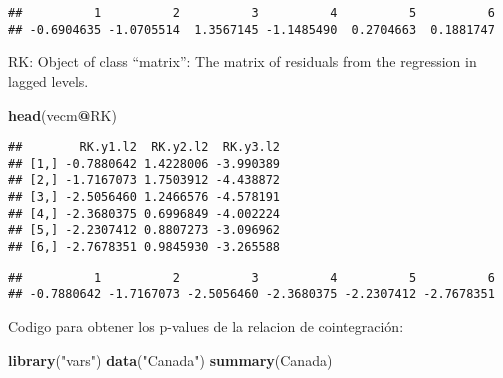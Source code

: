 \documentclass[]{book}
\newenvironment{Shaded}{\begin{snugshade}}{\end{snugshade}}
\newcommand{\KeywordTok}[1]{\textcolor[rgb]{0.13,0.29,0.53}{\textbf{#1}}}
\newcommand{\DecValTok}[1]{\textcolor[rgb]{0.00,0.00,0.81}{#1}}
\newcommand{\StringTok}[1]{\textcolor[rgb]{0.31,0.60,0.02}{#1}}
\newcommand{\OperatorTok}[1]{\textcolor[rgb]{0.81,0.36,0.00}{\textbf{#1}}}
\newcommand{\NormalTok}[1]{#1}
\theoremstyle{definition}
\theoremstyle{definition}
\theoremstyle{definition}
\theoremstyle{remark}
\begin{document}
\begin{verbatim}
##          1          2          3          4          5          6 
## -0.6904635 -1.0705514  1.3567145 -1.1485490  0.2704663  0.1881747
\end{verbatim}

RK: Object of class ``matrix'': The matrix of residuals from the
regression in lagged levels.

\begin{Shaded}
\begin{Highlighting}[]
\KeywordTok{head}\NormalTok{(vecm}\OperatorTok{@}\NormalTok{RK)}
\end{Highlighting}
\end{Shaded}

\begin{verbatim}
##        RK.y1.l2  RK.y2.l2  RK.y3.l2
## [1,] -0.7880642 1.4228006 -3.990389
## [2,] -1.7167073 1.7503912 -4.438872
## [3,] -2.5056460 1.2466576 -4.578191
## [4,] -2.3680375 0.6996849 -4.002224
## [5,] -2.2307412 0.8807273 -3.096962
## [6,] -2.7678351 0.9845930 -3.265588
\end{verbatim}

\begin{Shaded}
\end{Shaded}

\begin{verbatim}
##          1          2          3          4          5          6 
## -0.7880642 -1.7167073 -2.5056460 -2.3680375 -2.2307412 -2.7678351
\end{verbatim}

Codigo para obtener los p-values de la relacion de cointegración:

\begin{Shaded}
\begin{Highlighting}[]
\KeywordTok{library}\NormalTok{(}\StringTok{"vars"}\NormalTok{)}
\KeywordTok{data}\NormalTok{(}\StringTok{"Canada"}\NormalTok{)}
\KeywordTok{summary}\NormalTok{(Canada)}
\end{Highlighting}
\end{Shaded}
\end{document}
